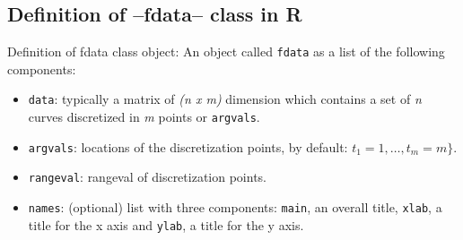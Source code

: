 \documentclass[
]{book}
\newenvironment{Shaded}{\begin{snugshade}}{\end{snugshade}}
\newcommand{\AttributeTok}[1]{\textcolor[rgb]{0.77,0.63,0.00}{#1}}
\newcommand{\DecValTok}[1]{\textcolor[rgb]{0.00,0.00,0.81}{#1}}
\newcommand{\FunctionTok}[1]{\textcolor[rgb]{0.00,0.00,0.00}{#1}}
\newcommand{\NormalTok}[1]{#1}
\newcommand{\OtherTok}[1]{\textcolor[rgb]{0.56,0.35,0.01}{#1}}
\newcommand{\SpecialCharTok}[1]{\textcolor[rgb]{0.00,0.00,0.00}{#1}}
\newcommand{\StringTok}[1]{\textcolor[rgb]{0.31,0.60,0.02}{#1}}
\providecommand{\tightlist}{%
  \setlength{\itemsep}{0pt}\setlength{\parskip}{0pt}}
\begin{document}
\begin{Shaded}
\end{Shaded}

\hypertarget{definition-of-fdata-class-in-r}{%
\subsection{Definition of --fdata-- class in R}\label{definition-of-fdata-class-in-r}}

Definition of fdata class object: An object called \texttt{fdata} as a list of the following components:

\begin{itemize}
\tightlist
\item
  \texttt{data}: typically a matrix of \emph{(n x m)} dimension which contains a set of \emph{n} curves discretized in \emph{m} points or \texttt{argvals}.
\item
  \texttt{argvals}: locations of the discretization points, by default: \({{t}_1=1,\ldots,{t}_m=m}\}\).
\item
  \texttt{rangeval}: rangeval of discretization points.
\item
  \texttt{names}: (optional) list with three components: \texttt{main}, an overall title, \texttt{xlab}, a title for the x axis and \texttt{ylab}, a title for the y axis.
\end{itemize}

\begin{Shaded}
\end{Shaded}
\end{document}
